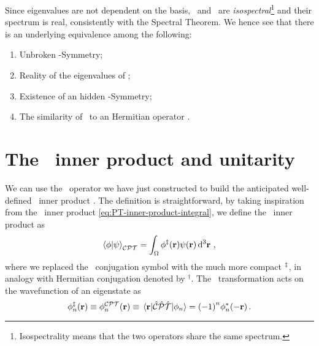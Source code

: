             Since eigenvalues are not dependent on the basis, \hH\ and \hF\ are \emph{isospectral}\footnote{Isospectrality means that the two operators share the same spectrum.} and their spectrum is real, consistently with the Spectral Theorem. We hence see that there is an underlying equivalence among the following:
            \begin{enumerate}[label = \mybullet]
                \item Unbroken \PT-Symmetry;
                \item Reality of the eigenvalues of \hH;
                \item Existence of an hidden \CPT-Symmetry;
                \item The similarity of \hH\ to an Hermitian operator \hF.
            \end{enumerate}

    \section{The \CPT\ inner product and unitarity}
        We can use the \hC\ operator we have just constructed to build the anticipated well-defined \CPT\ inner product \cite{bender2024}. The definition is straightforward, by taking inspiration from the \PT\ inner product \eqref{eq:PT-inner-product-integral}, we define the \CPT\ inner product as
        \begin{equation}
            \label{eq:CPT-inner-product}
            \braket{\phi}{\psi}_{\CPT} = \int\nolimits_\Omega \phi^{\myconj}\pqty{\vb{r}} \psi\pqty{\vb{r}} \dd[3]{\vb{r}}
            \mycomma
        \end{equation}
        where we replaced the \CPT\ conjugation symbol with the much more compact $^\ddag$, in analogy with Hermitian conjugation denoted by $^\dag$. The \CPT\ transformation acts on the wavefunction of an eigenstate as
        \begin{equation}
            \label{eq:CPT-conjugation}
            \phi_n^\myconj\pqty{\vb{r}}
            \equiv \phi_n^{\CPT}\pqty{\vb{r}}
            \equiv \mel{\vb{r}}{\hCPT}{\phi_n}
            = \pqty{-1}^n \phi_n^*\pqty{-\vb{r}}
            \myperiod
        \end{equation}

